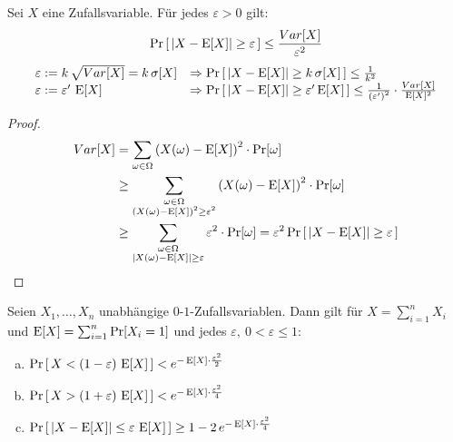 \begin{satz}[Chebychev]
	Sei $X$ eine Zufallsvariable. Für jedes $\varepsilon > 0$ gilt:
	\[
	  \Pr\left[\,|X-\operatorname{E}[X]| \geq \varepsilon\,\right] \leq \frac{Var[X]}{\varepsilon^2}
	\]
	\begin{equation*}
		\begin{array}{ll}
		\varepsilon := k\,\sqrt{Var[X]} = k\,\sigma[X] &\Rightarrow
		\Pr\left[\,|X - \operatorname{E}[X]| \geq k\,\sigma[X]\,\right] \leq
		\frac{1}{k^2} \\
		\varepsilon := \varepsilon^\prime\,\operatorname{E}[X] &\Rightarrow \Pr\left[\,|X-\operatorname{E}[X]| \geq
		\varepsilon^\prime \operatorname{E}[X]\,\right] \leq
		\frac{1}{\left(\varepsilon^\prime\right)^2}\cdot\frac{Var[X]}{\operatorname{E}[X]^2}
		\end{array}
	\end{equation*}
\end{satz}
\begin{proof}
	\begin{align*}
	  Var[X] &= \sum_{\omega \in \Omega} \left(X(\omega) - \operatorname{E}[X]\right)^2
	  \cdot \Pr[\omega] \\ 
	  &\geq
	  \sum_{\substack{\omega\in\Omega\\\left(X(\omega)-\operatorname{E}[X]\right)^2\geq\varepsilon^2}}
	  \left(X(\omega) - \operatorname{E}[X]\right)^2 \cdot \Pr[\omega]\\
	  &\geq \sum_{\substack{\omega\in\Omega\\|X(\omega)-\operatorname{E}[X]|\geq\varepsilon}}
	  \varepsilon^2 \cdot \Pr[\omega] = \varepsilon^2 \Pr\left[\,|X-\operatorname{E}[X]| \geq
	  \varepsilon\,\right]
	\end{align*}
\end{proof}
\begin{satz}
	Seien $X_1, \dots, X_n$ unabhängige $0$-$1$-Zufallsvariablen. Dann gilt
	für $X = \sum_{i=1}^n X_i$ und $\operatorname{E}[X] = \sum_{i=1}^n \Pr[X_i = 1]$ und
	jedes $\varepsilon, \ 0 < \varepsilon \leq 1$:
	\begin{enumerate}[(a)]
		\item $\Pr\left[\,X < (1-\varepsilon)\,\operatorname{E}[X]\,\right] <
			e^{-\operatorname{E}[X]\cdot\frac{\varepsilon^2}{2}}$
		\item $\Pr\left[\,X > (1+\varepsilon)\,\operatorname{E}[X]\,\right] <
			e^{-\operatorname{E}[X]\cdot\frac{\varepsilon^2}{4}}$
		\item $\Pr\left[\,|X-\operatorname{E}[X]| \leq \varepsilon\,\operatorname{E}[X]\,\right] \geq 1 -
			2\,e^{-\operatorname{E}[X]\cdot\frac{\varepsilon^2}{4}}$
	\end{enumerate}
\end{satz}
